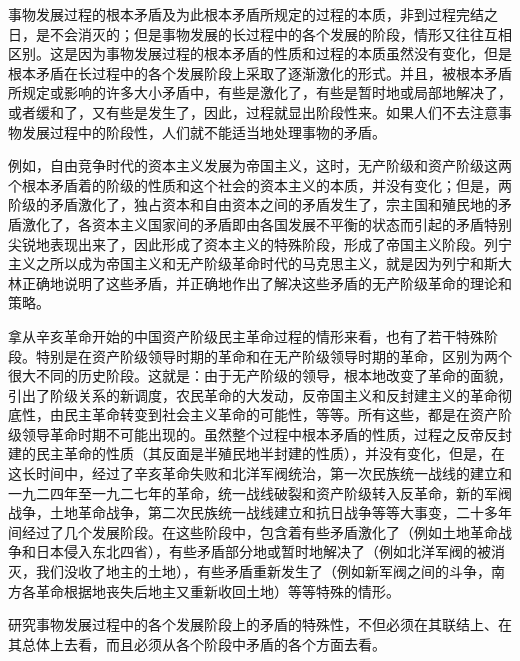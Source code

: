 \documentclass[UTF8, 12pt, a4paper]{ctexrep}
\begin{document}
事物发展过程的根本矛盾及为此根本矛盾所规定的过程的本质，非到过程完结之日，是不会消灭的；但是事物发展的长过程中的各个发展的阶段，情形又往往互相区别。这是因为事物发展过程的根本矛盾的性质和过程的本质虽然没有变化，但是根本矛盾在长过程中的各个发展阶段上采取了逐渐激化的形式。并且，被根本矛盾所规定或影响的许多大小矛盾中，有些是激化了，有些是暂时地或局部地解决了，或者缓和了，又有些是发生了，因此，过程就显出阶段性来。如果人们不去注意事物发展过程中的阶段性，人们就不能适当地处理事物的矛盾。

例如，自由竞争时代的资本主义发展为帝国主义，这时，无产阶级和资产阶级这两个根本矛盾着的阶级的性质和这个社会的资本主义的本质，并没有变化；但是，两阶级的矛盾激化了，独占资本和自由资本之间的矛盾发生了，宗主国和殖民地的矛盾激化了，各资本主义国家间的矛盾即由各国发展不平衡的状态而引起的矛盾特别尖锐地表现出来了，因此形成了资本主义的特殊阶段，形成了帝国主义阶段。列宁主义之所以成为帝国主义和无产阶级革命时代的马克思主义，就是因为列宁和斯大林正确地说明了这些矛盾，并正确地作出了解决这些矛盾的无产阶级革命的理论和策略。

拿从辛亥革命开始的中国资产阶级民主革命过程的情形来看，也有了若干特殊阶段。特别是在资产阶级领导时期的革命和在无产阶级领导时期的革命，区别为两个很大不同的历史阶段。这就是：由于无产阶级的领导，根本地改变了革命的面貌，引出了阶级关系的新调度，农民革命的大发动，反帝国主义和反封建主义的革命彻底性，由民主革命转变到社会主义革命的可能性，等等。所有这些，都是在资产阶级领导革命时期不可能出现的。虽然整个过程中根本矛盾的性质，过程之反帝反封建的民主革命的性质（其反面是半殖民地半封建的性质），并没有变化，但是，在这长时间中，经过了辛亥革命失败和北洋军阀统治，第一次民族统一战线的建立和一九二四年至一九二七年的革命，统一战线破裂和资产阶级转入反革命，新的军阀战争，土地革命战争，第二次民族统一战线建立和抗日战争等等大事变，二十多年间经过了几个发展阶段。在这些阶段中，包含着有些矛盾激化了（例如土地革命战争和日本侵入东北四省），有些矛盾部分地或暂时地解决了（例如北洋军阀的被消灭，我们没收了地主的土地），有些矛盾重新发生了（例如新军阀之间的斗争，南方各革命根据地丧失后地主又重新收回土地）等等特殊的情形。

研究事物发展过程中的各个发展阶段上的矛盾的特殊性，不但必须在其联结上、在其总体上去看，而且必须从各个阶段中矛盾的各个方面去看。
\end{document}
